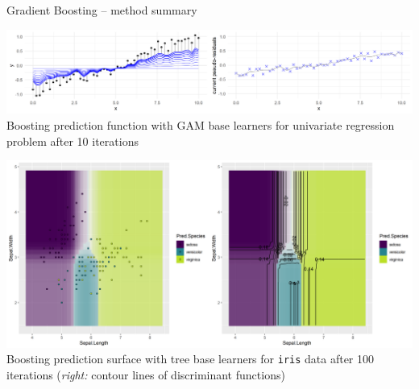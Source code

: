 \begin{frame}{Gradient Boosting -- method summary}
\begin{minipage}{0.45\textwidth}
  \centering
  \includegraphics[width=\textwidth, trim=0 0 450 0, clip]{
  ../slides/boosting/figure/illustration_gaussian_huber_2_10} \\
  \tiny{Boosting prediction function with GAM base learners for univariate 
  regression problem after 10 iterations}
\end{minipage}%
\hfill
\begin{minipage}{0.45\textwidth}
  \centering
  \includegraphics[width=\textwidth]{
  ../slides/boosting/figure/boosting_multiclass_100} \\
  \tiny{Boosting prediction surface with tree base learners for \texttt{iris} 
  data after 100 iterations (\textit{right:} contour lines of discriminant 
  functions)}
\end{minipage}

\end{frame}



